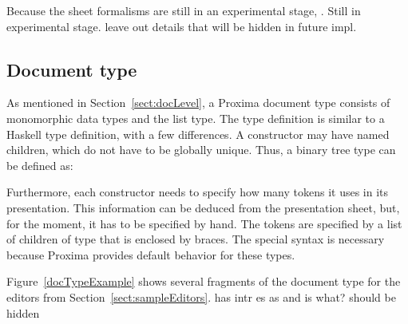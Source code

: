 Because the sheet formalisms are still in an experimental stage, . \toHere
Still in experimental stage. leave out details that will be hidden in future impl.
\fromHere

\subsection{Document type}

As mentioned in Section~\ref{sect:docLevel}, a Proxima document type consists of monomorphic data types and the list type. The type definition is similar to a Haskell type definition, with a few differences. A constructor may have named children, which do not have to be globally unique. Thus, a binary tree type can be defined as:


Furthermore, each constructor needs to specify how many tokens it uses in its presentation. This information can be deduced from the presentation sheet, but, for the moment, it has to be specified by hand. The tokens are specified by a list of children of type  that is enclosed by braces. The special syntax is necessary because Proxima provides default behavior for these types.  

Figure~\ref{docTypeExample} shows several fragments of the document type for the editors from Section~\ref{sect:sampleEditors}.  
 has intr es as and   is what? should be hidden


